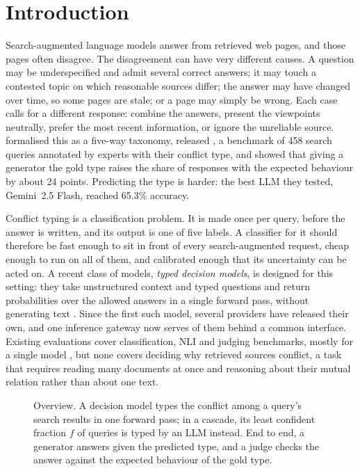 \section{Introduction}
\label{sec:intro}

Search-augmented language models answer from retrieved web pages, and those pages often disagree. The
disagreement can have very different causes. A question may be underspecified and admit several correct answers;
it may touch a contested topic on which reasonable sources differ; the answer may have changed over time, so some
pages are stale; or a page may simply be wrong. Each case calls for a different response: combine the answers,
present the viewpoints neutrally, prefer the most recent information, or ignore the unreliable source.
\citet{cattan2025dragged} formalised this as a five-way taxonomy, released \conflicts, a benchmark of 458 search
queries annotated by experts with their conflict type, and showed that giving a generator the gold type raises
the share of responses with the expected behaviour by about 24 points. Predicting the type is harder: the best LLM
they tested, Gemini~2.5 Flash, reached 65.3\% accuracy.

Conflict typing is a classification problem. It is made once per query, before the answer is written, and its
output is one of five labels. A classifier for it should therefore be fast enough to sit in front of every
search-augmented request, cheap enough to run on all of them, and calibrated enough that its uncertainty can be
acted on. A recent class of models, \emph{typed decision models}, is designed for this setting: they take
unstructured context and typed questions and return probabilities over the allowed answers in a single forward
pass, without generating text \citep{typesafe2026jev}. Since the first such model, several
providers have released their own, and one inference gateway now serves \ndm of them behind a common interface. Existing
evaluations cover classification, NLI and judging benchmarks, mostly for a single model
\citep{deusser2026jev,li2026specialized,duan2026general}, but none covers deciding why retrieved sources conflict,
a task that requires reading many documents at once and reasoning about their mutual relation rather than about
one text.

\begin{figure}[t]
\centering

\caption{Overview. A decision model types the conflict among a query's search results in one forward pass; in a
cascade, its least confident fraction $f$ of queries is typed by an LLM instead. End to end, a generator answers
given the predicted type, and a judge checks the answer against the expected behaviour of the gold type.}
\label{fig:overview}
\end{figure}

